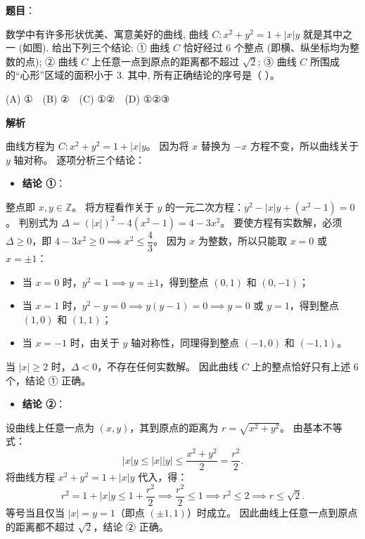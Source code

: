 \begin{answer}

\textbf{题目}：

数学中有许多形状优美、寓意美好的曲线, 曲线 $C: x^2 + y^2 = 1 + |x|y$ 就是其中之一 (如图). 给出下列三个结论:  
① 曲线 $C$ 恰好经过 6 个整点 (即横、纵坐标均为整数的点);  
② 曲线 $C$ 上任意一点到原点的距离都不超过 $\sqrt{2}$;  
③ 曲线 $C$ 所围成的“心形”区域的面积小于 3.  
其中, 所有正确结论的序号是（ ）。
\nopagebreak[4]
\begin{center}\end{center}
\nopagebreak[4]
(A) ①　(B) ②　(C) ①②　(D) ①②③

\textbf{解析}

曲线方程为 $C: x^2 + y^2 = 1 + |x|y$。
因为将 $x$ 替换为 $-x$ 方程不变，所以曲线关于 $y$ 轴对称。
逐项分析三个结论：

\begin{itemize}
\item \textbf{结论 ①}：
\end{itemize}
  整点即 $x, y \in \mathbb{Z}$。
  将方程看作关于 $y$ 的一元二次方程：$y^2 - |x|y + (x^2 - 1) = 0$。
  判别式为 $\Delta = (|x|)^2 - 4(x^2 - 1) = 4 - 3x^2$。
  要使方程有实数解，必须 $\Delta \geqslant 0$，即 $4 - 3x^2 \geqslant 0 \implies x^2 \leqslant \dfrac{4}{3}$。
  因为 $x$ 为整数，所以只能取 $x = 0$ 或 $x = \pm 1$：
\begin{itemize}
\item 当 $x = 0$ 时，$y^2 = 1 \implies y = \pm 1$，得到整点 $(0, 1)$ 和 $(0, -1)$；
\item 当 $x = 1$ 时，$y^2 - y = 0 \implies y(y - 1) = 0 \implies y = 0$ 或 $y = 1$，得到整点 $(1, 0)$ 和 $(1, 1)$；
\item 当 $x = -1$ 时，由关于 $y$ 轴对称性，同理得到整点 $(-1, 0)$ 和 $(-1, 1)$。
\end{itemize}
  当 $|x| \geqslant 2$ 时，$\Delta < 0$，不存在任何实数解。
  因此曲线 $C$ 上的整点恰好只有上述 6 个，结论 ① 正确。

\begin{itemize}
\item \textbf{结论 ②}：
\end{itemize}
  设曲线上任意一点为 $(x, y)$，其到原点的距离为 $r = \sqrt{x^2 + y^2}$。
  由基本不等式：
\nopagebreak[4]
\[|x|y \leqslant |x||y| \leqslant \frac{x^2 + y^2}{2} = \frac{r^2}{2}.\]
  将曲线方程 $x^2 + y^2 = 1 + |x|y$ 代入，得：
\nopagebreak[4]
\[r^2 = 1 + |x|y \leqslant 1 + \frac{r^2}{2} \implies \frac{r^2}{2} \leqslant 1 \implies r^2 \leqslant 2 \implies r \leqslant \sqrt{2}.\]
  等号当且仅当 $|x| = y = 1$（即点 $(\pm 1, 1)$）时成立。
  因此曲线上任意一点到原点的距离都不超过 $\sqrt{2}$，结论 ② 正确。


\end{answer}

